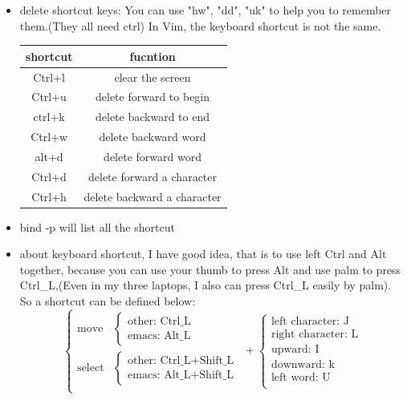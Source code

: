 \documentclass[a4paper,12pt,twoside]{book}
\begin{document}
\begin{itemize}
\item delete shortcut keys: You can use "hw", "dd", "uk" to help you to remember them.(They all need ctrl) In Vim, the keyboard shortcut is not the same. 
\begin{center}
  \begin{tabular}{|c|c|}
 \hline shortcut & fucntion \\
 \hline Ctrl+l & clear the screen \\	
\hline Ctrl+u & delete forward to begin\\
\hline ctrl+k & delete backward to end \\
\hline Ctrl+w & delete backward word\\
\hline alt+d & delete forward word \\
\hline Ctrl+d & delete forward a character  \\
\hline Ctrl+h & delete backward a character  \\
 \hline
  \end{tabular}
\end{center}
\item bind -p will list all the shortcut
\item  about keyboard shortcut, I have good idea, that is to use left Ctrl and Alt together, because you can use your thumb to press Alt and use palm to
	press Ctrl\_L,(Even in my three laptops, I also can press Ctrl\_L easily by palm).
	So a shortcut can be defined below:
	\[ \left\{ \begin{array}{cl}
	            \textrm{move} & \left\{ \begin{array}{c} \textrm{other: Ctrl\_L} \\ \textrm{emacs: Alt\_L} \end{array}  \right. \\
		    \textrm{select} & \left\{ \begin{array}{c} \textrm{other: Ctrl\_L+Shift\_L} \\ \textrm{emacs: Alt\_L+Shift\_L} \end{array}  \right. \\
	           \end{array} \right. + \left\{ \begin{array}{c}
						\textrm{left character: J} \\
						\textrm{right character: L}\\
						\textrm{upward: I}\\
						\textrm{downward: k}\\
						\textrm{left word: U}\\

\end{array}\]
\end{itemize}
\end{document}
